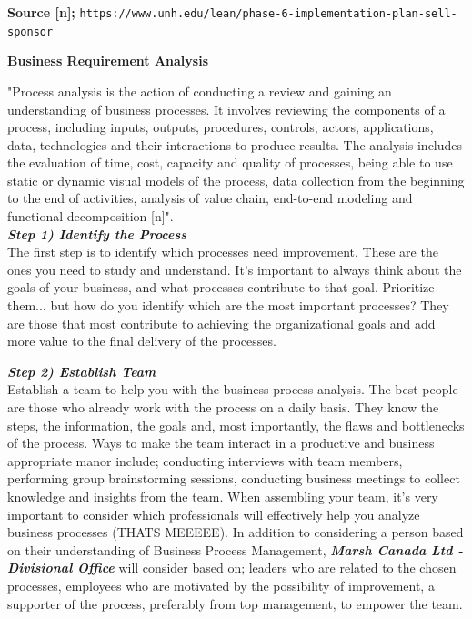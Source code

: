 \documentclass{article}
\begin{document}
\vspace{0.2cm}

\hspace{-0.67cm} \textbf{Source [n];} \texttt{https://www.unh.edu/lean/phase-6-implementation-plan-sell-sponsor}

\newpage

\hspace{-0.65cm} \large{\textbf{Business Requirement Analysis}} \\

\normalsize{

"Process analysis is the action of conducting a review and gaining an understanding of business processes. It involves reviewing the components of a process, including inputs, outputs, procedures, controls, actors, applications, data, technologies and their interactions to produce results. The analysis includes the evaluation of time, cost, capacity and quality of processes, being able to use static or dynamic visual models of the process, data collection from the beginning to the end of activities, analysis of value chain, end-to-end modeling and functional decomposition [n]". \\

\textbf{\textit{Step 1) Identify the Process}} \\

The first step is to identify which processes need improvement. These are the ones you need to study and understand. It’s important to always think about the goals of your business, and what processes contribute to that goal. Prioritize them... but how do you identify which are the most important processes? They are those that most contribute to achieving the organizational goals and add more value to the final delivery of the processes. \\

\vspace{0.3cm}

\textbf{\textit{Step 2) Establish Team}} \\

Establish a team to help you with the business process analysis. The best people are those who already work with the process on a daily basis. They know the steps, the information, the goals and, most importantly, the flaws and bottlenecks of the process. Ways to make the team interact in a productive and business appropriate manor include; conducting interviews with team members, performing group brainstorming sessions, conducting business meetings to collect knowledge and insights from the team. When assembling your team, it’s very important to consider which professionals will effectively help you analyze business processes (THATS MEEEEE). In addition to considering a person based on their understanding of Business Process Management, \textit{\textbf{Marsh Canada Ltd - Divisional Office}} will consider based on; leaders who are related to the chosen processes, employees who are motivated by the possibility of improvement, a supporter of the process, preferably from top management, to empower the team. \\

}
\end{document}
